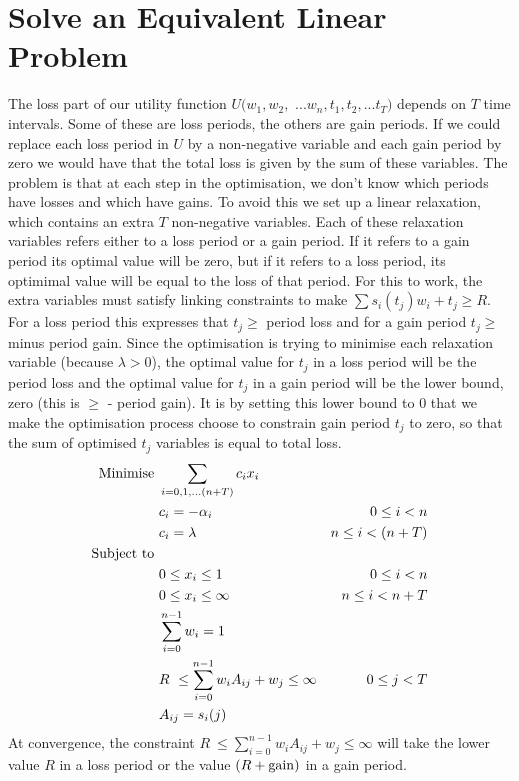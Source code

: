 \documentclass[12pt]{article}
\begin{document}
\section{Solve an Equivalent Linear Problem}
The loss part of our utility function $U(w_1,w_2,$ $...w_n,t_1,t_2,...t_T)$ depends on $T$ time intervals. Some of these
are loss periods, the others are gain periods. If we could replace each loss period in $U$ by a non-negative variable and each gain period by
zero we would have that the total loss is given by the sum of these variables. The problem is that at each step in the optimisation,
we don't know which periods have losses and which have gains. To avoid this we set up a linear relaxation, which contains an extra $T$ non-negative variables. Each of these relaxation variables
refers either to a loss period or a gain period. If it refers to a gain period its optimal value will be zero, but if it refers to a loss period,
its optimimal value will be equal to the loss of that period. For this to work, the extra variables must satisfy
linking constraints to make $\sum s_i( t_j )w_i +t_j \ge R$. For a loss period this expresses that $t_j \ge$ period loss and for a gain period
$t_j \ge$ minus period gain. Since the optimisation is trying to minimise each relaxation variable (because $\lambda > 0$), the optimal value 
for $t_j$ in a loss period will be the period loss and the optimal value for $t_j$ in a gain period will be the lower bound, zero (this is $\ge$ - period gain).
It is by setting this lower bound to 0 that we make the optimisation process choose to constrain gain period 
$t_j$ to zero, so that the sum of optimised $t_j$ variables is equal to total loss.
\begin{align}
    {\rm Minimise}\ & \sum_{i=0,1,...(n+T)} c_i x_i\cr
    & c_i=-\alpha_i &0\le i < n\cr
    &c_i =\lambda &n\le i < (n+T)\cr
    {\rm Subject\ to}\ &\cr& 0 \le x_i \le 1\ &0\le i < n\cr
    & 0 \le x_i \le \infty\ &n\le i < n+T\cr
    & \sum_{i=0}^{n-1} w_i = 1\cr
    & R\ \le\sum_{i=0}^{n-1} w_i A_{ij} + w_j \le\infty &0\le j < T\cr
    & A_{ij} = s_i(j)\cr
\end{align}
At convergence, the constraint $R\ \le\sum_{i=0}^{n-1} w_i A_{ij} + w_j \le\infty$ will take the lower value $R$ in a loss period or the value $(R+{\rm gain})$ in a gain period.
\end{document}
